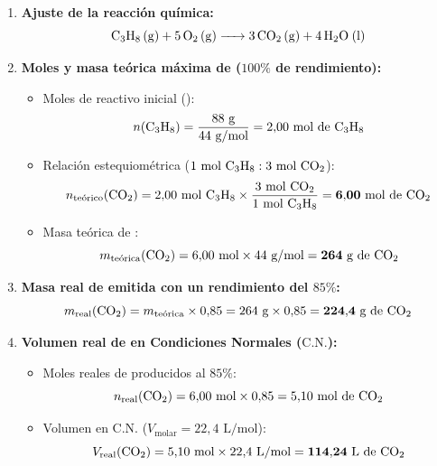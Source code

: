﻿\documentclass[11pt,a4paper]{article}
\begin{document}
\vspace{0.2cm}
\begin{enumerate}[label=\textbf{\alph*)}, leftmargin=2em, itemsep=10pt]
    \item \textbf{Ajuste de la reacción química:}
    \[
    \ce{C3H8 (g) + 5 O2 (g) -> 3 CO2 (g) + 4 H2O (l)}
    \]

    \item \textbf{Moles y masa teórica máxima de  ($100\%$ de rendimiento):}
    \begin{itemize}[leftmargin=1.5em, itemsep=3pt]
        \item Moles de reactivo inicial ():
        \[
        n(\ce{C3H8}) = \frac{88\text{ g}}{44\text{ g/mol}} = 2{,}00\text{ mol de \ce{C3H8}}
        \]
        \item Relación estequiométrica ($1\text{ mol \ce{C3H8}} : 3\text{ mol \ce{CO2}}$):
        \[
        n_{\text{teórico}}(\ce{CO2}) = 2{,}00\text{ mol \ce{C3H8}} \times \frac{3\text{ mol \ce{CO2}}}{1\text{ mol \ce{C3H8}}} = \mathbf{6{,}00\text{ mol de \ce{CO2}}}
        \]
        \item Masa teórica de :
        \[
        m_{\text{teórica}}(\ce{CO2}) = 6{,}00\text{ mol} \times 44\text{ g/mol} = \mathbf{264\text{ g de \ce{CO2}}}
        \]
    \end{itemize}

    \item \textbf{Masa real de  emitida con un rendimiento del $85\%$:}
    \[
    m_{\text{real}}(\ce{CO2}) = m_{\text{teórica}} \times 0{,}85 = 264\text{ g} \times 0{,}85 = \mathbf{224{,}4\text{ g de \ce{CO2}}}
    \]

    \item \textbf{Volumen real de  en Condiciones Normales ($\text{C.N.}$):}
    \begin{itemize}[leftmargin=1.5em, itemsep=3pt]
        \item Moles reales de  producidos al $85\%$:
        \[
        n_{\text{real}}(\ce{CO2}) = 6{,}00\text{ mol} \times 0{,}85 = 5{,}10\text{ mol de \ce{CO2}}
        \]
        \item Volumen en C.N. ($V_{\text{molar}} = 22{,}4\text{ L/mol}$):
        \[
        V_{\text{real}}(\ce{CO2}) = 5{,}10\text{ mol} \times 22{,}4\text{ L/mol} = \mathbf{114{,}24\text{ L de \ce{CO2}}}
        \]
    \end{itemize}
\end{enumerate}

\newpage
\end{document}
